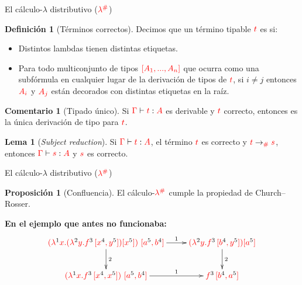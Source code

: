 \documentclass{beamer}
\theoremstyle{definition}
\newtheorem{defes}{Definición}
\newtheorem{lemes}{Lema}
\newtheorem{proes}{Proposición}
\newtheorem{comes}{Comentario}
\newcommand{\cDist}[1]{{\color{red} #1}}
\newcommand{\clambdadist}{\cDist{\lambdadist}}
\newcommand{\cLab}[1]{{\color{black} #1}}
\begin{document}
\begin{frame}{El cálculo-$\lambda$ distributivo ($\clambdadist$)}
\begin{defes}[Términos correctos]
Decimos que un término tipable $\cDist{t}$ es  si:
\begin{itemize}
\item Distintos lambdas tienen distintas etiquetas.
\item Para todo multiconjunto de tipos $\cDist{[A_1, ..., A_n]}$ que ocurra como una subfórmula
en cualquier lugar de la derivación de tipos de $\cDist{t}$, si $i\neq j$ entonces
$\cDist{A_i}$ y $\cDist{A_j}$ están decorados con distintas etiquetas en la raíz.
\end{itemize}
\end{defes}

\begin{comes}[Tipado único]
Si $\cDist{\tctx} \vdash \cDist{t} : \cDist{A}$ es derivable y $\cDist{t}$ correcto,
entonces es la única derivación de tipo para $\cDist{t}$.
\end{comes}

\begin{lemes}[\emph{Subject reduction}]
Si $\cDist{\tctx} \vdash \cDist{t} : \cDist{A}$, el término $\cDist{t}$
es correcto y $\cDist{t} \to_{\cDist{\dist}} \cDist{s}$,
entonces $\cDist{\tctx} \vdash \cDist{s} : \cDist{A}$ y $\cDist{s}$ es correcto.
\end{lemes}
\end{frame}


\begin{frame}{El cálculo-$\lambda$ distributivo ($\clambdadist$)}
\begin{proes}[Confluencia]
El cálculo-$\clambdadist$ cumple la propiedad de Church--Rosser.
\end{proes}

\vskip 1cm
\textbf{En el ejemplo que antes no funcionaba:}
\[
\xymatrix{
  \cDist{(\lamp{\cLab1}{x}{(\lamp{\cLab2}{y}{f^{\cLab3}\,[x^{\cLab4}, y^{\cLab5}]}) [x^{\cLab5}]})\ [a^{\cLab5}, b^{\cLab4}]} \ar^-{2}[d] \ar^-{1}[r] & \cDist{(\lamp{\cLab2}{y}{f^{\cLab3}\,[b^{\cLab4}, y^{\cLab5}]}) [a^{\cLab5}]} \ar^-{2}[d] \\
  \cDist{(\lamp{\cLab1}{x}{f^{\cLab3}\,[x^{\cLab4}, x^{\cLab5}]})\ [a^{\cLab5}, b^{\cLab4}]} \ar^-{1}[r] & \cDist{f^{\cLab3}\,[b^{\cLab4}, a^{\cLab5}]}\\
}
\]
\end{frame}
\end{document}
